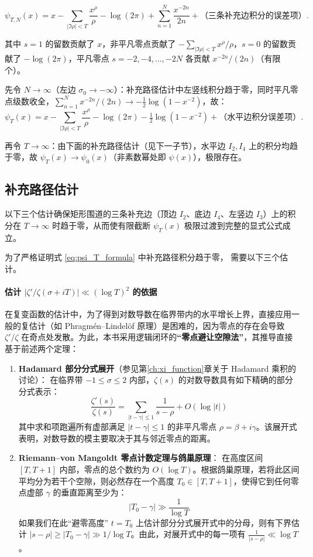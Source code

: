 \begin{equation}
\psi_{T,N}(x) = x - \sum_{|\Im\rho|<T} \frac{x^{\rho}}{\rho} - \log(2\pi) + \sum_{n=1}^{N}\frac{x^{-2n}}{2n} + \text{（三条补充边积分的误差项）}.
\label{eq:psi_T_formula}
\end{equation}

其中 $s=1$ 的留数贡献了 $x$，非平凡零点贡献了 $-\sum_{|\Im\rho|<T}x^\rho/\rho$，$s=0$ 的留数贡献了 $-\log(2\pi)$，平凡零点 $s=-2,-4,\ldots,-2N$ 各贡献 $x^{-2n}/(2n)$（有限个）。

先令 $N\to\infty$（左边 $\sigma_0\to-\infty$）：补充路径估计中左竖线积分趋于零，同时平凡零点级数收全，$\sum_{n=1}^N x^{-2n}/(2n)\to-\tfrac12\log(1-x^{-2})$，故：
\[
\psi_T(x) = x - \sum_{|\Im\rho|<T} \frac{x^{\rho}}{\rho} - \log(2\pi) - \tfrac12\log(1-x^{-2}) + \text{（水平边积分误差项）}.
\]

再令 $T\to\infty$：由下面的补充路径估计（见下一子节），水平边 $I_2, I_4$ 上的积分均趋于零，故
$\psi_T(x)\to\psi_0(x)$（非素数幂处即 $\psi(x)$），极限存在。

\subsection{补充路径估计}\label{sec:path-estimation}

以下三个估计确保矩形围道的三条补充边（顶边 $I_2$、底边 $I_4$、左竖边 $I_3$）上的积分在 $T\to\infty$ 时趋于零，从而使有限截断 $\psi_T(x)$ 极限过渡到完整的显式公式成立。

为了严格证明式 \eqref{eq:psi_T_formula} 中补充路径积分趋于零，
需要以下三个估计。


\paragraph{估计 $|\zeta'/\zeta(\sigma+iT)| \ll (\log T)^2$ 的依据}
在复变函数的估计中，为了得到对数导数在临界带内的水平增长上界，直接应用一般的复估计（如 Phragmén--Lindelöf 原理）是困难的，因为零点的存在会导致 $\zeta'/\zeta$ 在奇点处发散。为此，本书采用逻辑闭环的\textbf{“零点避让空隙法”}，其推导直接基于前述两个定理：

\begin{enumerate}
  \item \textbf{Hadamard 部分分式展开}（参见第\ref{ch:xi_function}章关于 Hadamard 乘积的讨论）：
        在临界带 $-1 \le \sigma \le 2$ 内部，$\zeta(s)$ 的对数导数具有如下精确的部分分式表示：
        \[
        \frac{\zeta'(s)}{\zeta(s)} = \sum_{|t - \gamma| \le 1} \frac{1}{s - \rho} + O(\log |t|)
        \]
        其中求和项跑遍所有虚部满足 $|t-\gamma| \le 1$ 的非平凡零点 $\rho = \beta + i\gamma$。该展开式表明，对数导数的模主要取决于其与邻近零点的距离。
  \item \textbf{Riemann--von Mangoldt 零点计数定理与鸽巢原理}：
        在高度区间 $[T, T+1]$ 内部，零点的总个数约为 $O(\log T)$。根据鸽巢原理，若将此区间平均分为若干个空隙，则必然存在一个高度 $T_0 \in [T, T+1]$，使得它到任何零点虚部 $\gamma$ 的垂直距离至少为：
        \[
        |T_0 - \gamma| \gg \frac{1}{\log T}
        \]
        如果我们在此“避零高度” $t = T_0$ 上估计部分分式展开式中的分母，则有下界估计 $|s - \rho| \ge |T_0 - \gamma| \gg 1/\log T$。由此，对展开式中的每一项有 $\frac{1}{|s-\rho|} \ll \log T$。
\end{enumerate}

